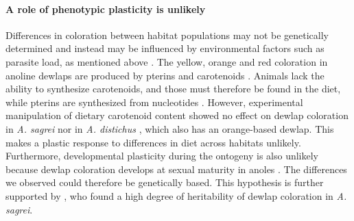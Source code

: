 \paragraph{A role of phenotypic plasticity is unlikely} Differences in coloration between habitat populations may not be genetically determined and instead may be influenced by environmental factors such as parasite load, as mentioned above \citep{Cook2013}. The yellow, orange and red coloration in anoline dewlaps are produced by pterins and carotenoids \citep{Ortiz1962, Ortiz1962a, Ortiz1963, Ortiz1966, Macedonia2000, Steffen2007, Steffen2009}. Animals lack the ability to synthesize carotenoids, and those must therefore be found in the diet, while pterins are synthesized from nucleotides \citep{Goodwin1984, Hill2002, Hill2006}. However, experimental manipulation of dietary carotenoid content showed no effect on dewlap coloration in \textit{A. sagrei} \citep{Steffen2010} nor in \textit{A. distichus} \citep{Ng2013}, which also has an orange-based dewlap. This makes a plastic response to differences in diet across habitats unlikely. Furthermore, developmental plasticity during the ontogeny is also unlikely because dewlap coloration develops at sexual maturity in anoles \citep{Ng2013}. The differences we observed could therefore be genetically based. This hypothesis is further supported by \citet{Cox2017}, who found a high degree of heritability of dewlap coloration in \textit{A. sagrei}. %





